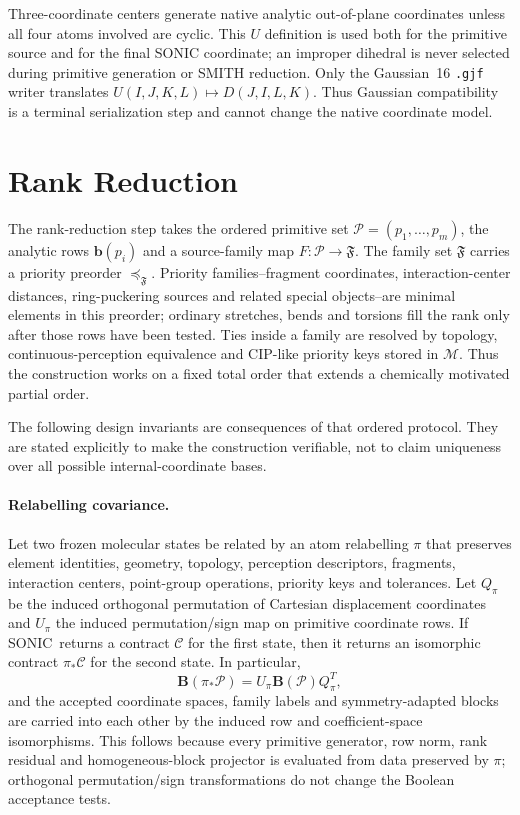 \documentclass[journal=jctcce,manuscript=article,layout=traditional]{achemso}
\newcommand{\SONIC}{SONIC}
\newcommand{\Bmat}{\mathbf{B}}
\newcommand{\bmat}{\mathbf{b}}
\theoremstyle{definition}
\begin{document}
Three-coordinate centers generate native analytic out-of-plane coordinates
unless all four atoms involved are cyclic.  This \(U\) definition is used both
for the primitive source and for the final SONIC coordinate; an improper
dihedral is never selected during primitive generation or SMITH reduction.  Only
the Gaussian~16 \texttt{.gjf} writer translates
\(U(I,J,K,L)\mapsto D(J,I,L,K)\).  Thus Gaussian compatibility is a terminal
serialization step and cannot change the native coordinate model.

\section{Rank Reduction}

The rank-reduction step takes the ordered primitive set
\(\mathcal{P}=(p_1,\ldots,p_m)\), the analytic rows
\(\bmat(p_i)\) and a source-family map \(F:\mathcal{P}\to\mathfrak{F}\).
The family set \(\mathfrak{F}\) carries a priority preorder
\(\preceq_{\mathfrak{F}}\).  Priority families--fragment coordinates,
interaction-center distances, ring-puckering sources and related special
objects--are minimal elements in this preorder; ordinary stretches, bends and
torsions fill the rank only after those rows have been tested.  Ties inside
a family are resolved by topology, continuous-perception equivalence and
CIP-like priority keys stored in \(\mathcal{M}\).  Thus the construction works on a
fixed total order that extends a chemically motivated partial order.

The following design invariants are consequences of that ordered protocol.
They are stated explicitly to make the construction verifiable, not to claim
uniqueness over all possible internal-coordinate bases.

\paragraph{Relabelling covariance.}
\label{thm:relabel}
Let two frozen molecular states be related by an atom relabelling \(\pi\) that
preserves element identities, geometry, topology, perception descriptors, fragments,
interaction centers, point-group operations, priority keys and tolerances.  Let
\(Q_\pi\) be the induced orthogonal permutation of Cartesian displacement
coordinates and \(U_\pi\) the induced permutation/sign map on primitive
coordinate rows.  If \SONIC\ returns a contract \(\mathcal{C}\) for the first
state, then it returns an isomorphic contract \(\pi_*\mathcal{C}\) for the
second state.  In particular,
\[
  \Bmat(\pi_*\mathcal{P})
  =
  U_\pi \Bmat(\mathcal{P}) Q_\pi^T,
\]
and the accepted coordinate spaces, family labels and symmetry-adapted blocks
are carried into each other by the induced row and coefficient-space
isomorphisms.
This follows because every primitive generator, row norm, rank residual and
homogeneous-block projector is evaluated from data preserved by \(\pi\);
orthogonal permutation/sign transformations do not change the Boolean
acceptance tests.
\end{document}
